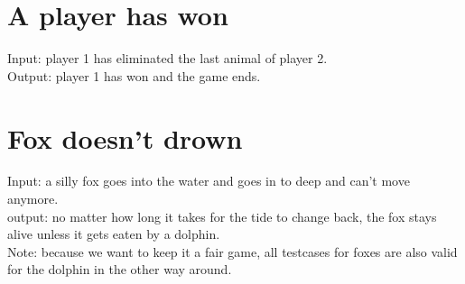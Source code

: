 \documentclass[a4paper,11pt]{article}
\begin{document}
    \section{A player has won}
    Input: player 1 has eliminated the last animal of player 2.\\
    Output: player 1 has won and the game ends.\\

    \section{Fox doesn't drown}
    Input: a silly fox goes into the water and goes in to deep and can't move anymore.\\
    output: no matter how long it takes for the tide to change back, the fox stays alive unless it gets eaten by a dolphin.\\


    Note: because we want to keep it a fair game, all testcases for foxes are also valid for the dolphin in the other way around.\\
\end{document}
